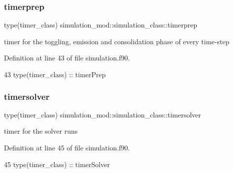 \subsubsection{\texorpdfstring{timerprep}{timerprep}}
{\footnotesize\ttfamily type(timer\+\_\+class) simulation\+\_\+mod\+::simulation\+\_\+class\+::timerprep\hspace{0.3cm}{\ttfamily [private]}}



timer for the toggling, emission and consolidation phase of every time-\/step 



Definition at line 43 of file simulation.\+f90.


\begin{DoxyCode}
43         \textcolor{keywordtype}{type}(timer\_class) :: timerPrep
\end{DoxyCode}
\mbox{\label{structsimulation__mod_1_1simulation__class_a25e03717a6e87410b816ac1f299b282b}} 
\subsubsection{\texorpdfstring{timersolver}{timersolver}}
{\footnotesize\ttfamily type(timer\+\_\+class) simulation\+\_\+mod\+::simulation\+\_\+class\+::timersolver\hspace{0.3cm}{\ttfamily [private]}}



timer for the solver runs 



Definition at line 45 of file simulation.\+f90.


\begin{DoxyCode}
45         \textcolor{keywordtype}{type}(timer\_class) :: timerSolver
\end{DoxyCode}
\mbox{\label{structsimulation__mod_1_1simulation__class_ad43e06086299c6f9b4d37c90f81bca6c}} 

